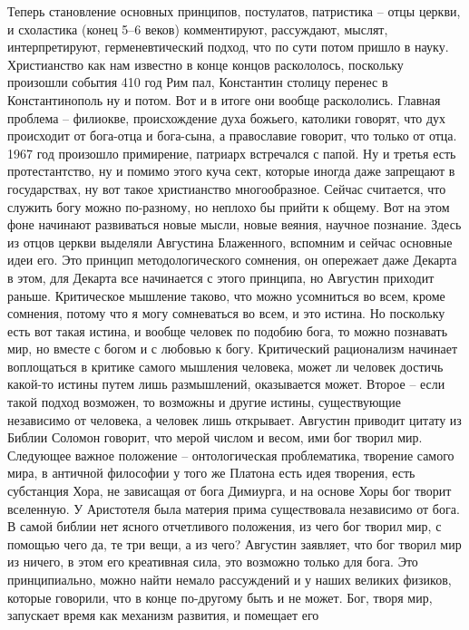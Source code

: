 \documentclass[a4paper, 12pt]{article}
\begin{document}
Теперь становление основных принципов, постулатов, патристика -- отцы 
церкви, и схоластика (конец 5--6 веков) комментируют, рассуждают, 
мыслят, интерпретируют, герменевтический подход, что по сути потом 
пришло в науку. Христианство как нам известно в конце концов 
раскололось, поскольку произошли события 410 год Рим пал, Константин 
столицу перенес в Константинополь ну и потом. Вот и в итоге они вообще 
раскололись. Главная проблема -- филиокве, происхождение духа божьего, 
католики говорят, что дух происходит от бога-отца и бога-сына, 
а православие говорит, что только от отца. 1967 год произошло 
примирение, патриарх встречался с папой. Ну и третья есть 
протестантство, ну и помимо этого куча сект, которые иногда даже 
запрещают в государствах, ну вот такое христианство многообразное. 
Сейчас считается, что служить богу можно по-разному, но неплохо бы 
прийти к общему. Вот на этом фоне начинают развиваться новые мысли, 
новые веяния, научное познание. Здесь из отцов церкви выделяли Августина 
Блаженного, вспомним и сейчас основные идеи его. Это принцип 
методологического сомнения, он опережает даже Декарта в этом, для 
Декарта все начинается с этого принципа, но Августин приходит раньше. 
Критическое мышление таково, что можно усомниться во всем, кроме 
сомнения, потому что я могу сомневаться во всем, и это истина. Но 
поскольку есть вот такая истина, и вообще человек по подобию бога, то 
можно познавать мир, но вместе с богом и с любовью к богу. Критический 
рационализм начинает воплощаться в критике самого мышления человека, 
может ли человек достичь какой-то истины путем лишь размышлений, 
оказывается может. Второе -- если такой подход возможен, то возможны 
и другие истины, существующие независимо от человека, а человек лишь 
открывает. Августин приводит цитату из Библии Соломон говорит, что мерой 
числом и весом, ими бог творил мир. Следующее важное положение -- 
онтологическая проблематика, творение самого мира, в античной философии 
у того же Платона есть идея творения, есть субстанция Хора, не зависащая 
от бога Димиурга, и на основе Хоры бог творит вселенную. У Аристотеля 
была материя прима существовала независимо от бога. В самой библии нет 
ясного отчетливого положения, из чего бог творил мир, с помощью чего да, 
те три вещи, а из чего? Августин заявляет, что бог творил мир из ничего, 
в этом его креативная сила, это возможно только для бога. Это 
принципиально, можно найти немало рассуждений и у наших великих физиков, 
которые говорили, что в конце по-другому быть и не может. Бог, творя 
мир, запускает время как механизм развития, и помещает его 
\end{document}
